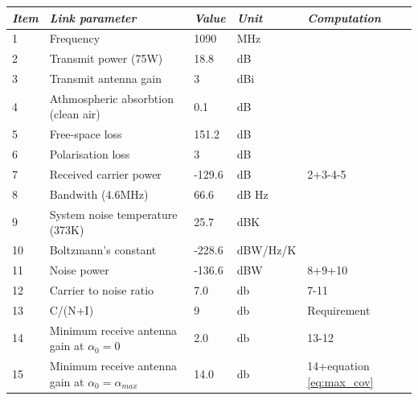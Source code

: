 \begin{center}
 \label{tab:1090}
  \begin{tabular}{ l  l  l  l  l}
    \hline
   \textit{Item} & \textit{Link parameter} & \textit{Value} & \textit{Unit} & \textit{Computation} \\ \hline
    1 & Frequency	& 1090 & MHz & \\ \hline
    2 & Transmit power (75W) & 18.8 & dB & \\ \hline
    3 & Transmit antenna gain & 3 & dBi & \\ \hline
    4 & Athmospheric absorbtion (clean air) & 0.1 & dB & \\ \hline
    5 & Free-space loss & 151.2 & dB & \\ \hline
    6 & Polarisation loss & 3 & dB & \\ \hline
    7 & Received carrier power & -129.6 & dB & 2+3-4-5\\ \hline
    8 & Bandwith (4.6MHz) & 66.6 & dB Hz & \\ \hline 
    9 & System noise temperature (373K) & 25.7 & dBK& \\ \hline 
    10 & Boltzmann's constant & -228.6 & dBW/Hz/K& \\ \hline 
    11 & Noise power & -136.6 & dBW& 8+9+10\\ \hline 
    12 & Carrier to noise ratio & 7.0 & db & 7-11\\ \hline 
    13 & C/(N+I) & 9 & db & Requirement\\ \hline
    14 & Minimum receive antenna gain at $\alpha_0 = 0 $ & 2.0 & db & 13-12\\ \hline
    15 & Minimum receive antenna gain at $\alpha_0 = \alpha_{max} $ & 14.0 & db & 14+equation \ref{eq:max_cov} \\ \hline  \end{tabular}
\end{center}


